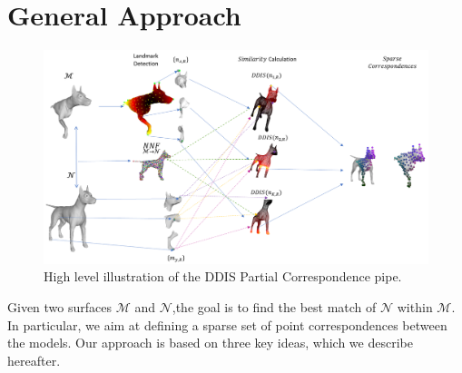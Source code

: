 \documentclass[10pt,twocolumn,letterpaper]{article}
\begin{document}
\section{General Approach}
\label{sec:algorithm}
\begin{figure}[htb]
	\centering
	\includegraphics[width=1\textwidth]{figures/Birds_Flight.png}
	\caption{High level illustration of the DDIS Partial Correspondence pipe.}
\end{figure}

Given two surfaces $\mathcal{M}$ and $\mathcal{N}$,the goal is to find the best match of  $\mathcal{N}$ within  $\mathcal{M}$.
In particular, we aim at defining a sparse set of point correspondences between the models. 
Our approach is based on three key ideas, which we describe hereafter.
\end{document}
